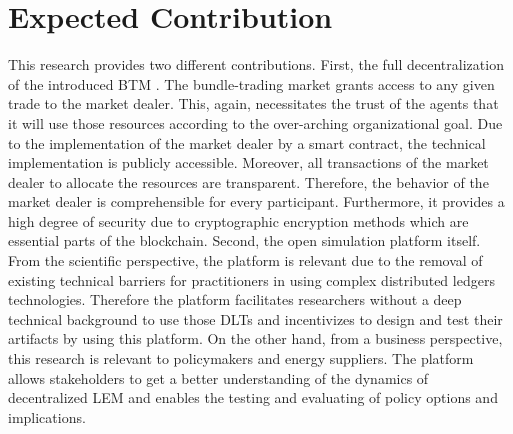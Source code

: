 \section{Expected Contribution}
\label{sec:expected_contribution}

This research provides two different contributions. 
First, the full decentralization of the introduced BTM . 
The bundle-trading market grants access to any given trade to the market dealer. 
This, again, necessitates the trust of the agents that it will use those resources
according to the over-arching organizational goal. Due to the implementation 
of the market dealer by a smart contract, the technical implementation 
is publicly accessible. Moreover, all transactions of the market dealer 
to allocate the resources are transparent. Therefore, the behavior of the 
market dealer is comprehensible for every participant. Furthermore, it provides 
a high degree of security due to cryptographic encryption methods which are essential 
parts of the blockchain.
Second, the open simulation platform itself. From the scientific perspective, 
the platform is relevant due to the removal of existing technical barriers 
for practitioners in using complex distributed ledgers technologies. 
Therefore the platform facilitates researchers without a deep 
technical background to use those DLTs and incentivizes to design 
and test their artifacts by using this platform. 
On the other hand, from a business perspective, this research is 
relevant to policymakers and energy suppliers. The platform allows 
stakeholders to get a better understanding of the dynamics of decentralized 
LEM and enables the testing and evaluating of policy options and implications. 

\clearpage